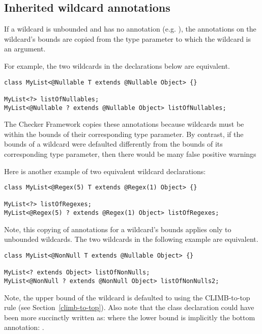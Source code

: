 \subsection{Inherited wildcard annotations\label{inherited-wildcard-annotations}}

If a wildcard is unbounded and has no annotation (e.g. ),
the annotations on the wildcard's bounds are copied from the type parameter
to which the wildcard is an argument.

For example, the two wildcards in
the declarations below are equivalent.

\begin{Verbatim}
class MyList<@Nullable T extends @Nullable Object> {}

MyList<?> listOfNullables;
MyList<@Nullable ? extends @Nullable Object> listOfNullables;
\end{Verbatim}

The Checker Framework copies
these annotations because wildcards must be within the bounds of their
corresponding type parameter.
By contrast, if the bounds of a wildcard
were defaulted differently from the bounds of its corresponding type
parameter, then there would be many false positive
 warnings

Here is another example of two equivalent wildcard declarations:

\begin{Verbatim}
class MyList<@Regex(5) T extends @Regex(1) Object> {}

MyList<?> listOfRegexes;
MyList<@Regex(5) ? extends @Regex(1) Object> listOfRegexes;
\end{Verbatim}

Note, this copying of annotations for a wildcard's bounds applies only to
unbounded wildcards.  The two wildcards in the
following example are equivalent.

\begin{Verbatim}
class MyList<@NonNull T extends @Nullable Object> {}

MyList<? extends Object> listOfNonNulls;
MyList<@NonNull ? extends @NonNull Object> listOfNonNulls2;
\end{Verbatim}

Note, the upper bound of the wildcard  is defaulted to
 using the CLIMB-to-top rule (see Section~\ref{climb-to-top}).
Also note that the  class declaration could have been more succinctly
written as:  where the lower bound
is implicitly the bottom annotation: .

